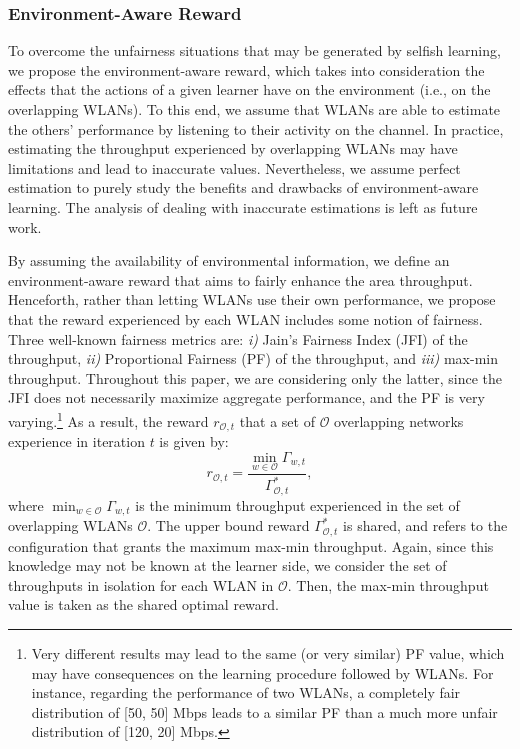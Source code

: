 \documentclass{article}
\begin{document}
\subsubsection{Environment-Aware Reward}
\label{subsubsection:informed_learning}
To overcome the unfairness situations that may be generated by selfish learning, we propose the environment-aware reward, which takes into consideration the effects that the actions of a given learner have on the environment (i.e., on the overlapping WLANs). To this end, we assume that WLANs are able to estimate the others' performance by listening to their activity on the channel. In practice, estimating the throughput experienced by overlapping WLANs may have limitations and lead to inaccurate values. Nevertheless, we assume perfect estimation to purely study the benefits and drawbacks of environment-aware learning. The analysis of dealing with inaccurate estimations is left as future work.

By assuming the availability of environmental information, we define an environment-aware reward that aims to fairly enhance the area throughput. Henceforth, rather than letting WLANs use their own performance, we propose that the reward experienced by each WLAN includes some notion of fairness. Three well-known fairness metrics are: \emph{i)} Jain's Fairness Index (JFI) of the throughput, \emph{ii)} Proportional Fairness (PF) of the throughput, and \emph{iii)} max-min throughput. Throughout this paper, we are considering only the latter, since the JFI does not necessarily maximize aggregate performance, and the PF is very varying.\footnote{Very different results may lead to the same (or very similar) PF value, which may have consequences on the learning procedure followed by WLANs. For instance, regarding the performance of two WLANs, a completely fair distribution of [50, 50] Mbps leads to a similar PF than a much more unfair distribution of [120, 20] Mbps.} As a result, the reward $r_{\mathcal{O},t}$ that a set of $\mathcal{O}$ overlapping networks experience in iteration $t$ is given by:
\begin{equation}
	r_{\mathcal{O},t} =\frac{\min_{w \in \mathcal{O}} \Gamma_{w,t}}{\Gamma_{\mathcal{O},t}^*}, 
	\nonumber
\end{equation}			
where $\min_{w \in \mathcal{O}} \Gamma_{w,t}$ is the minimum throughput experienced in the set of overlapping WLANs $\mathcal{O}$. The upper bound reward $\Gamma_{\mathcal{O},t}^*$ is shared, and refers to the configuration that grants the maximum max-min throughput. Again, since this knowledge may not be known at the learner side, we consider the set of throughputs in isolation for each WLAN in $\mathcal{O}$. Then, the max-min throughput value is taken as the shared optimal reward.
\end{document}
